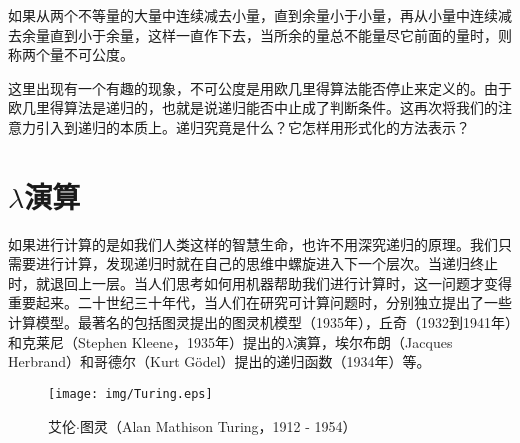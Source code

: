 \documentclass[UTF8]{article}
\begin{document}
\begin{proposition}
如果从两个不等量的大量中连续减去小量，直到余量小于小量，再从小量中连续减去余量直到小于余量，这样一直作下去，当所余的量总不能量尽它前面的量时，则称两个量不可公度。
\end{proposition}

这里出现有一个有趣的现象，不可公度是用欧几里得算法能否停止来定义的。由于欧几里得算法是递归的，也就是说递归能否中止成了判断条件。这再次将我们的注意力引入到递归的本质上。递归究竟是什么？它怎样用形式化的方法表示？

\begin{Exercise}
\end{Exercise}

\section{$\lambda$演算}

如果进行计算的是如我们人类这样的智慧生命，也许不用深究递归的原理。我们只需要进行计算，发现递归时就在自己的思维中螺旋进入下一个层次。当递归终止时，就退回上一层。当人们思考如何用机器帮助我们进行计算时，这一问题才变得重要起来。二十世纪三十年代，当人们在研究可计算问题时，分别独立提出了一些计算模型。最著名的包括图灵提出的图灵机模型（1935年），丘奇（1932到1941年）和克莱尼（Stephen Kleene，1935年）提出的$\lambda$演算，埃尔布朗（Jacques Herbrand）和哥德尔（Kurt Gödel）提出的递归函数（1934年）等。

\begin{figure}[htbp]
 \centering
 \texttt{[image: img/Turing.eps]}
 \captionsetup{labelformat=empty}
 \caption{艾伦$\cdot$图灵（Alan Mathison Turing，1912 - 1954）}
 \label{fig:Turing}
\end{figure}
\end{document}
